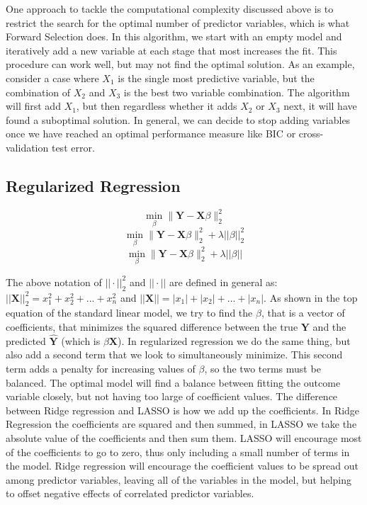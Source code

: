 \documentclass{article}
\newcommand{\bX}{\mathbf{X}}
\newcommand{\bY}{\mathbf{Y}}
\begin{document}
One approach to tackle the computational complexity discussed above is to restrict the search for the optimal number of 
predictor variables, which is what Forward Selection does. In this algorithm, we start with an empty model and iteratively add a 
new variable at each stage that most increases the fit. This procedure can work well, but may not find the optimal solution. As 
an example, consider a case where $X_1$ is the single most predictive variable, but the combination of $X_2$ and $X_3$ is 
the best two variable combination. The algorithm will first add $X_1$, but then regardless whether it adds $X_2$ or $X_3$ next, 
it will have found a suboptimal solution. In general, we can decide to stop adding variables once we have reached an optimal 
performance measure like BIC or cross-validation test error.


\subsection{Regularized Regression}

	\[\min_{\beta}  \|\bY - \bX\beta\|_{2}^{2} \tag{linear model}\]
	\[\min_{\beta}  \|\bY - \bX\beta\|_{2}^{2} + \lambda||\beta||_2^2 \tag{ridge regression}\]
	\[\min_{\beta}  \|\bY - \bX\beta\|_{2}^{2} + \lambda||\beta|| \tag{LASSO}\]

The above notation of $||\cdot||_{2}^{2}$ and  $||\cdot||$ are defined in general as: $||\bX||_{2}^{2} = x_1^2 + x_2^2 + ... + 
x_n^2$ and $||\bX|| = |x_1| + |x_2| + ... + |x_n|$. As shown in the top equation of the standard linear model, we try to find the $\beta$, that is a vector of coefficients,  
that minimizes the squared difference between the true $\bY$ and the predicted $\hat{\bY}$ (which is $\beta\bX$). In 
regularized regression we do the same thing, but also add a second term that we look to simultaneously minimize. This second 
term adds a penalty for increasing values of $\beta$, so the two terms must be balanced. The optimal model will find a balance 
between fitting the outcome variable closely, but not having too large of coefficient values. The difference between Ridge 
regression and LASSO is how we add up the coefficients. In Ridge Regression the coefficients are squared and then summed, 
in LASSO we take the absolute value of 
the coefficients and then sum them. LASSO will encourage most of the coefficients to go to zero, thus only including a small 
number of terms in the model. Ridge regression will encourage the coefficient values to be spread out among predictor 
variables, leaving all of the variables in the model, but helping to offset negative effects of correlated predictor variables. 
\end{document}
